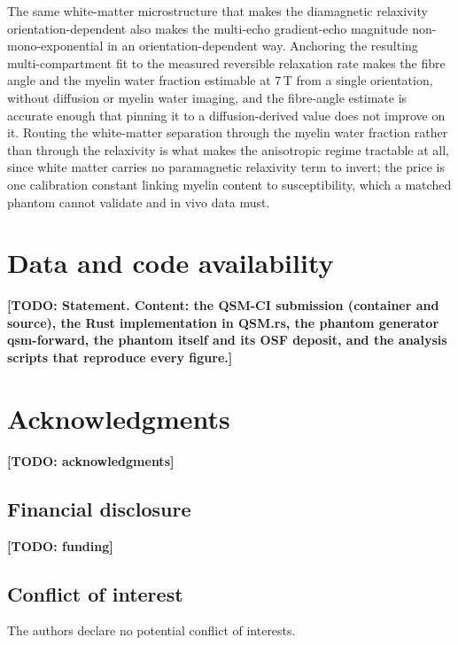 \documentclass[AMA,STIX2COL,Linenumberson]{MRM}
\newcommand{\TODO}[1]{{\color{red}\textbf{[TODO: #1]}}}
\newcommand{\TODO}[1]{}
\begin{document}
The same white-matter microstructure that makes the diamagnetic relaxivity orientation-dependent also makes the multi-echo gradient-echo magnitude non-mono-exponential in an orientation-dependent way. Anchoring the resulting multi-compartment fit to the measured reversible relaxation rate makes the fibre angle and the myelin water fraction estimable at 7\,T from a single orientation, without diffusion or myelin water imaging, and the fibre-angle estimate is accurate enough that pinning it to a diffusion-derived value does not improve on it. Routing the white-matter separation through the myelin water fraction rather than through the relaxivity is what makes the anisotropic regime tractable at all, since white matter carries no paramagnetic relaxivity term to invert; the price is one calibration constant linking myelin content to susceptibility, which a matched phantom cannot validate and in vivo data must.


\section*{Data and code availability}

\TODO{Statement. Content: the QSM-CI submission (container and source), the Rust implementation in QSM.rs, the phantom generator qsm-forward, the phantom itself and its OSF deposit, and the analysis scripts that reproduce every figure.}

\section*{Acknowledgments}
\TODO{acknowledgments}

\subsection*{Financial disclosure}
\TODO{funding}

\subsection*{Conflict of interest}
The authors declare no potential conflict of interests.


\end{document}

